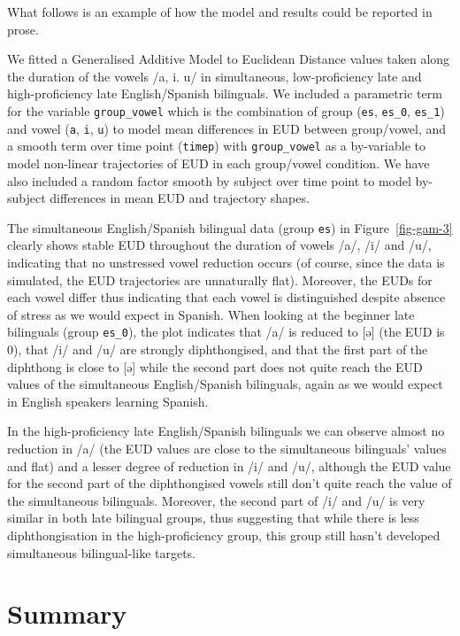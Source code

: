 \documentclass[
  letterpaper,
  DIV=11,
  numbers=noendperiod]{scrartcl}
\begin{document}
What follows is an example of how the model and results could be
reported in prose.

We fitted a Generalised Additive Model to Euclidean Distance values
taken along the duration of the vowels /a, i. u/ in simultaneous,
low-proficiency late and high-proficiency late English/Spanish
bilinguals. We included a parametric term for the variable
\texttt{group\_vowel} which is the combination of group (\texttt{es},
\texttt{es\_0}, \texttt{es\_1}) and vowel (\texttt{a}, \texttt{i},
\texttt{u}) to model mean differences in EUD between group/vowel, and a
smooth term over time point (\texttt{timep}) with \texttt{group\_vowel}
as a by-variable to model non-linear trajectories of EUD in each
group/vowel condition. We have also included a random factor smooth by
subject over time point to model by-subject differences in mean EUD and
trajectory shapes.

The simultaneous English/Spanish bilingual data (group \texttt{es}) in
Figure~\ref{fig-gam-3} clearly shows stable EUD throughout the duration
of vowels /a/, /i/ and /u/, indicating that no unstressed vowel
reduction occurs (of course, since the data is simulated, the EUD
trajectories are unnaturally flat). Moreover, the EUDs for each vowel
differ thus indicating that each vowel is distinguished despite absence
of stress as we would expect in Spanish. When looking at the beginner
late bilinguals (group \texttt{es\_0}), the plot indicates that /a/ is
reduced to {[}ə{]} (the EUD is 0), that /i/ and /u/ are strongly
diphthongised, and that the first part of the diphthong is close to
{[}ə{]} while the second part does not quite reach the EUD values of the
simultaneous English/Spanish bilinguals, again as we would expect in
English speakers learning Spanish.

In the high-proficiency late English/Spanish bilinguals we can observe
almost no reduction in /a/ (the EUD values are close to the simultaneous
bilinguals' values and flat) and a lesser degree of reduction in /i/ and
/u/, although the EUD value for the second part of the diphthongised
vowels still don't quite reach the value of the simultaneous bilinguals.
Moreover, the second part of /i/ and /u/ is very similar in both late
bilingual groups, thus suggesting that while there is less
diphthongisation in the high-proficiency group, this group still hasn't
developed simultaneous bilingual-like targets.

\section{Summary}\label{summary}
\end{document}
